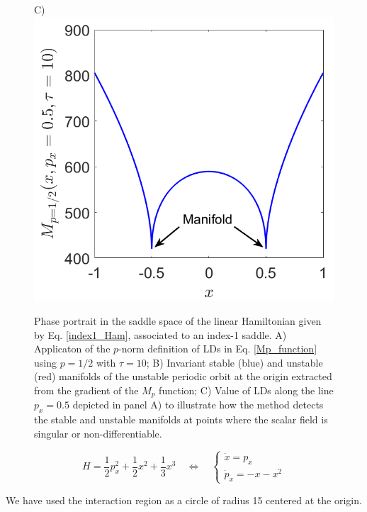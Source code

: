 \documentclass[8pt]{article}
\begin{document}
\begin{figure}[htbp]
\begin{center}
		C)\includegraphics[scale=0.24]{detectMani_Saddle_tau_10.png}
	\end{center}
	\caption{Phase portrait in the saddle space of the linear Hamiltonian given by Eq. \eqref{index1_Ham}, associated to an index-1 saddle. A) Applicaton of the $p$-norm definition of LDs in Eq. \eqref{Mp_function} using $p = 1/2$ with $\tau = 10$; B) Invariant stable (blue) and unstable (red) manifolds of the unstable periodic orbit at the origin extracted from the gradient of the $M_p$ function; C) Value of LDs along the line $p_x = 0.5$ depicted in panel A) to illustrate how the method detects the stable and unstable manifolds at points where the scalar field is singular or non-differentiable.}
	\label{index1_lds}
\end{figure}


\bigskip
\bigskip
\bigskip
\bigskip

\begin{equation}
H = \dfrac{1}{2} p_x^2 + \dfrac{1}{2} x^2 + \dfrac{1}{3} x^3 \quad \Leftrightarrow \quad
\begin{cases}
\dot{x} = p_x \\
\dot{p}_{x} = - x - x^2
\end{cases}
\label{fish_Ham}
\end{equation}

We have used the interaction region as a circle of radius 15 centered at the origin.
\end{document}
